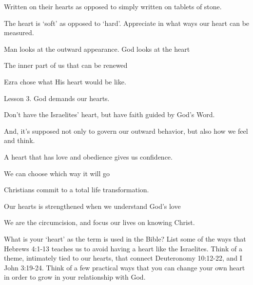 \begin{discussion}

Written on their hearts as opposed to simply written on tablets of stone.

The heart is `soft' as opposed to `hard'.  Appreciate in what ways our heart can be measured.


 Man looks at the outward appearance.  God looks at the heart

 The inner part of us that can be renewed

 Ezra chose what His heart would be like.

 Lesson 3.  God demands our hearts.


 Don't have the Israelites' heart, but have faith guided by God's Word.

And, it's supposed not only to govern our outward behavior, but also how we feel and think.

 A heart that has love and obedience gives us confidence.\\


 We can choose which way it will go

 Christians commit to a total life transformation.

 Our hearts is strengthened when we understand God's love

 We are the circumcision, and focus our lives on knowing Christ.

\end{discussion}

\begin{questions}
\q What is your `heart' as the term is used in the Bible?
\q List some of the ways that Hebrews 4:1-13 teaches us to avoid having a heart like the Israelites.
\q Think of a theme, intimately tied to our hearts, that connect Deuteronomy 10:12-22, and I John 3:19-24.
\q Think of a few practical ways that you can change your own heart in order to grow in your relationship with God.
\end{questions}